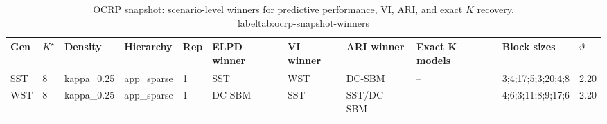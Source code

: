 \begin{table}[!h]
\centering
\caption{OCRP snapshot: scenario-level winners for predictive performance, VI, ARI, and exact $K$ recovery.\\label{tab:ocrp-snapshot-winners}}
\centering
\begin{tabular}[t]{lllllllllll}
\toprule
Gen & $K^\star$ & Density & Hierarchy & Rep & ELPD winner & VI winner & ARI winner & Exact K models & Block sizes & $\vartheta$\\
\midrule
SST & 8 & kappa_0.25 & app_sparse & 1 & SST & WST & DC-SBM & -- & 3;4;17;5;3;20;4;8 & 2.20\\
WST & 8 & kappa_0.25 & app_sparse & 1 & DC-SBM & SST & SST/DC-SBM & -- & 4;6;3;11;8;9;17;6 & 2.20\\
\bottomrule
\end{tabular}
\end{table}
